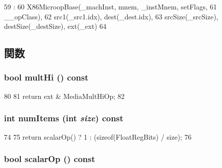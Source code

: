 \begin{DoxyCode}
59                                    :
60             X86MicroopBase(_machInst, mnem, _instMnem, setFlags,
61                     __opClass),
62             src1(_src1.idx), dest(_dest.idx),
63             srcSize(_srcSize), destSize(_destSize), ext(_ext)
64         {}

\end{DoxyCode}


\subsection{関数}
\hypertarget{classX86ISA_1_1MediaOpBase_a394db50a3c5ecab351a577b848c905ee}{
\subsubsection[{multHi}]{\setlength{\rightskip}{0pt plus 5cm}bool multHi () const}}
\label{classX86ISA_1_1MediaOpBase_a394db50a3c5ecab351a577b848c905ee}



\begin{DoxyCode}
80         {
81             return ext & MediaMultHiOp;
82         }
\end{DoxyCode}
\hypertarget{classX86ISA_1_1MediaOpBase_abaed42f5a25261855b65b65a64288315}{
\subsubsection[{numItems}]{\setlength{\rightskip}{0pt plus 5cm}int numItems (int {\em size}) const}}
\label{classX86ISA_1_1MediaOpBase_abaed42f5a25261855b65b65a64288315}



\begin{DoxyCode}
74         {
75             return scalarOp() ? 1 : (sizeof(FloatRegBits) / size);
76         }
\end{DoxyCode}
\hypertarget{classX86ISA_1_1MediaOpBase_abc581ef39802e6cdf91f6115c0bda692}{
\subsubsection[{scalarOp}]{\setlength{\rightskip}{0pt plus 5cm}bool scalarOp () const}}
\label{classX86ISA_1_1MediaOpBase_abc581ef39802e6cdf91f6115c0bda692}



